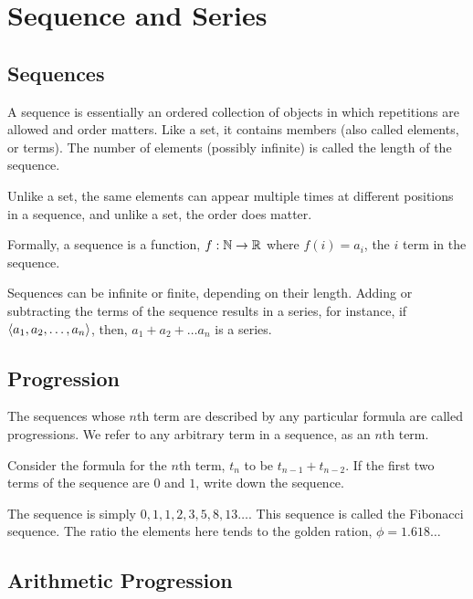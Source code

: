 \chapter{Sequence and Series}

\section{Sequences}

A sequence is essentially an ordered collection of objects in which repetitions are allowed and order matters. 
Like a set, it contains members (also called elements, or terms). 
The number of elements (possibly infinite) is called the length of the sequence. 

Unlike a set, the same elements can appear multiple times at different positions in a sequence, 
and unlike a set, the order does matter.

Formally, a sequence is a function, \(f : \mathbb N \to \mathbb R\) where \(f(i) = a_i\), the 
\(i\) term in the sequence. 

Sequences can be infinite or finite, depending on their length. Adding 
or subtracting the terms of the sequence results in a series, for instance, 
if \(\left\langle a_1, a_2, \dots, a_{n}\right\rangle\), then, \(a_1 + a_2 + \dots a_n\) is a series.

\section{Progression}

The sequences whose \(n\)th term are described by any particular formula are called 
progressions. We refer to any arbitrary term in a sequence, as an \(n\)th term.

\begin{example}
    Consider the formula for the \(n\)th term, \(t_n\) to be \(t_{n-1} + t_{n-2}\). If 
    the first two terms of the sequence are \(0\) and \(1\), write down the sequence.
    
    \begin{soln}
        The sequence is simply \(0, 1, 1, 2, 3, 5, 8, 13 \dots\). This sequence is called 
        the Fibonacci sequence. The ratio the elements here tends to the golden 
        ration, \(\phi = 1.618\dots\)
    \end{soln}
\end{example}
 
\section{Arithmetic Progression}

